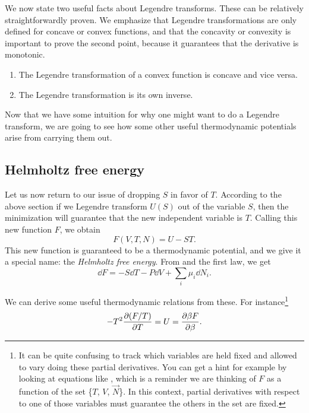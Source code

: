 We now state two useful facts about Legendre transforms. These can
be relatively straightforwardly proven. We emphasize that Legendre
transformations are only defined for concave or convex functions, and
that the concavity or convexity is important to prove the second point,
because it guarantees that the derivative is monotonic.
\begin{proposition}{}{}
  \begin{enumerate}
    \item The Legendre transformation of a convex function is concave
          and vice versa.
    \item The Legendre transformation is its own inverse.
  \end{enumerate}
\end{proposition}

Now that we have some intuition for why one might want to do a
Legendre transform, we are going to see how some other useful
thermodynamic potentials arise from carrying them out.

\subsection{Helmholtz free energy}
Let us now return to our issue of dropping $S$ in favor
of $T$. According to the above section if we
Legendre transform $U(S)$ out of the variable $S$, then the minimization
will guarantee that the new independent variable is $T$. Calling
this new function $F$, we obtain
\begin{equation}\label{eq:helmholtz}
  F(V,T,N)=U-ST.
\end{equation}
This new function is guaranteed to be a thermodynamic potential, and
we give it a special name: the {\it Helmholtz free energy}.
From  and the first law, we get
\begin{equation}\label{eq:helmholtz1st}
  \dd F = -S\dd T-P\dd V+\sum_i\mu_i\dd{N}_i.
\end{equation}

We can derive some useful thermodynamic relations from these. For
instance\footnote{It can be quite confusing to track which variables
are held fixed and allowed to vary doing these partial derivatives.
You can get a hint for example by looking at equations like
, which is a reminder we are thinking of
$F$ as a function of the set \{$T$, $V$, $\vec{N}$\}. In this context,
partial derivatives with respect to one of those variables must
guarantee the others in the set are fixed.}
\begin{equation}\label{eq:dfdt}
  -T^2\pdv{(F/T)}{T}=U=\pdv{\beta F}{\beta}.
\end{equation}

